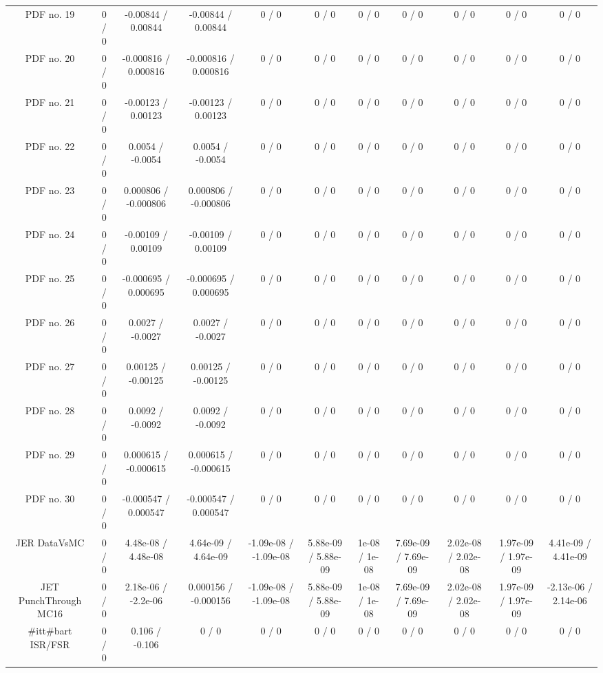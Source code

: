 \begin{table}[htbp]
\begin{center}
\begin{tabular}{|c|c|c|c|c|c|c|c|c|c|c|}
  PDF no. 19 & 0 / 0 & -0.00844 / 0.00844 & -0.00844 / 0.00844 & 0 / 0 & 0 / 0 & 0 / 0 & 0 / 0 & 0 / 0 & 0 / 0 & 0 / 0 \\ 
  PDF no. 20 & 0 / 0 & -0.000816 / 0.000816 & -0.000816 / 0.000816 & 0 / 0 & 0 / 0 & 0 / 0 & 0 / 0 & 0 / 0 & 0 / 0 & 0 / 0 \\ 
  PDF no. 21 & 0 / 0 & -0.00123 / 0.00123 & -0.00123 / 0.00123 & 0 / 0 & 0 / 0 & 0 / 0 & 0 / 0 & 0 / 0 & 0 / 0 & 0 / 0 \\ 
  PDF no. 22 & 0 / 0 & 0.0054 / -0.0054 & 0.0054 / -0.0054 & 0 / 0 & 0 / 0 & 0 / 0 & 0 / 0 & 0 / 0 & 0 / 0 & 0 / 0 \\ 
  PDF no. 23 & 0 / 0 & 0.000806 / -0.000806 & 0.000806 / -0.000806 & 0 / 0 & 0 / 0 & 0 / 0 & 0 / 0 & 0 / 0 & 0 / 0 & 0 / 0 \\ 
  PDF no. 24 & 0 / 0 & -0.00109 / 0.00109 & -0.00109 / 0.00109 & 0 / 0 & 0 / 0 & 0 / 0 & 0 / 0 & 0 / 0 & 0 / 0 & 0 / 0 \\ 
  PDF no. 25 & 0 / 0 & -0.000695 / 0.000695 & -0.000695 / 0.000695 & 0 / 0 & 0 / 0 & 0 / 0 & 0 / 0 & 0 / 0 & 0 / 0 & 0 / 0 \\ 
  PDF no. 26 & 0 / 0 & 0.0027 / -0.0027 & 0.0027 / -0.0027 & 0 / 0 & 0 / 0 & 0 / 0 & 0 / 0 & 0 / 0 & 0 / 0 & 0 / 0 \\ 
  PDF no. 27 & 0 / 0 & 0.00125 / -0.00125 & 0.00125 / -0.00125 & 0 / 0 & 0 / 0 & 0 / 0 & 0 / 0 & 0 / 0 & 0 / 0 & 0 / 0 \\ 
  PDF no. 28 & 0 / 0 & 0.0092 / -0.0092 & 0.0092 / -0.0092 & 0 / 0 & 0 / 0 & 0 / 0 & 0 / 0 & 0 / 0 & 0 / 0 & 0 / 0 \\ 
  PDF no. 29 & 0 / 0 & 0.000615 / -0.000615 & 0.000615 / -0.000615 & 0 / 0 & 0 / 0 & 0 / 0 & 0 / 0 & 0 / 0 & 0 / 0 & 0 / 0 \\ 
  PDF no. 30 & 0 / 0 & -0.000547 / 0.000547 & -0.000547 / 0.000547 & 0 / 0 & 0 / 0 & 0 / 0 & 0 / 0 & 0 / 0 & 0 / 0 & 0 / 0 \\ 
  JER DataVsMC & 0 / 0 & 4.48e-08 / 4.48e-08 & 4.64e-09 / 4.64e-09 & -1.09e-08 / -1.09e-08 & 5.88e-09 / 5.88e-09 & 1e-08 / 1e-08 & 7.69e-09 / 7.69e-09 & 2.02e-08 / 2.02e-08 & 1.97e-09 / 1.97e-09 & 4.41e-09 / 4.41e-09 \\ 
  JET PunchThrough MC16 & 0 / 0 & 2.18e-06 / -2.2e-06 & 0.000156 / -0.000156 & -1.09e-08 / -1.09e-08 & 5.88e-09 / 5.88e-09 & 1e-08 / 1e-08 & 7.69e-09 / 7.69e-09 & 2.02e-08 / 2.02e-08 & 1.97e-09 / 1.97e-09 & -2.13e-06 / 2.14e-06 \\ 
  #it{t#bar{t}} ISR/FSR & 0 / 0 & 0.106 / -0.106 & 0 / 0 & 0 / 0 & 0 / 0 & 0 / 0 & 0 / 0 & 0 / 0 & 0 / 0 & 0 / 0 \\ 

\end{tabular}
\end{center}
\end{table}
